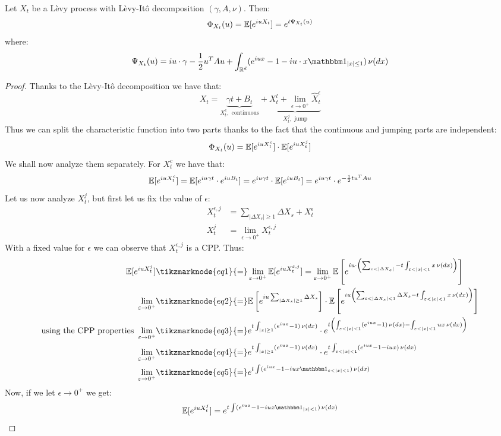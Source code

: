 \begin{definition}
    Let $X_t$ be a Lèvy process with Lèvy-Itô decomposition $(\gamma, A, \nu)$.
    Then: 
    \[ \Phi_{X_t}(u) = \mathbb{E}[e^{iuX_t}] = e^{t\Psi_{X_t}(u)} \]
    where:
    \[
        \Psi_{X_t}(u) = iu\cdot\gamma-\frac{1}{2}u^TAu+\int_{\R^d}(e^{iux} - 1 -
        iu\cdot x\I_{|x|\leq1}) \,\nu(dx)
    \]
\end{definition}
\begin{proof}
Thanks to the Lèvy-Itô decomposition we have that:
\[
    X_t = \underbrace{\gamma t + B_t}_{X_t^c, \text{ continuous}} +
    \underbrace{X_t^l + \lim_{\epsilon \to 0^+} \hat{X}^\epsilon_t}_{X_t^j, 
    \text{ jump}}
\]
Thus we can split the characteristic function into two parts thanks to the fact
that the continuous and jumping parts are independent:
\[ \Phi_{X_t}(u) = \mathbb{E}[e^{iuX_t^c}] \cdot \mathbb{E}[e^{iuX_t^j}] \]
We shall now analyze them separately. For $X_t^c$ we have that:
\[
    \mathbb{E}[e^{iuX_t^c}] = \mathbb{E}[e^{iu\gamma t} \cdot e^{iuB_t}] =
    e^{iu\gamma t} \cdot \mathbb{E}[e^{iuB_t}]  = e^{iu\gamma t} \cdot e^{-\frac{1}{2}t
    u^T A u}
\]
Let us now analyze $X_t^j$, but first let us fix the value of $\epsilon$:
\begin{align*}
    X^{\epsilon, j}_t & = \sum_{|\Delta X_s| \geq 1} \Delta X_s + X^\epsilon_t\\
    X^j_t & = \lim_{\epsilon\to0^+} X^{\epsilon, j}_t
\end{align*}
With a fixed value for $\epsilon$ we can observe that $X^{\epsilon, j}_t$ is a
CPP. Thus:
\begin{align*}
    \E[e^{iuX^j_t}] &\tikzmarknode{eq1}{=} \lim_{\epsilon\to0^+}
    \E[e^{iuX^{\epsilon, j}_t}] = \lim_{\epsilon\to0^+} \E\left[
    e^{iu\cdot\left( \sum_{\epsilon<|\Delta X_s|} - t\int_{\epsilon<|x|<1} x \,
    \nu(dx) \right)} \right] \\
    \lim_{\epsilon\to0^+} &\tikzmarknode{eq2}{=} \E\left[e^{iu\sum_{|\Delta X_s|
    \geq 1}\Delta X_s}\right] \cdot \E\left[e^{iu\left( \sum_{\epsilon<|
    \Delta X_s|<1}\Delta X_s - t\int_{\epsilon<|x|<1} x \, \nu(dx) \right)}
    \right] \\
    \text{using the CPP properties }\lim_{\epsilon\to0^+} &\tikzmarknode{eq3}{=}
    e^{t\int_{|x|\geq1}(e^{iux}-1)\,\nu(dx)} \cdot e^{t \left( \int_{\epsilon<|
    x|<1}(e^{iux}-1)\,\nu(dx) - \int_{\epsilon<|x|<1} ux \, \nu(dx) \right)} \\
    \lim_{\epsilon\to0^+} &\tikzmarknode{eq4}{=} e^{t\int_{|x|\geq1}(e^{iux}-1)
    \, \nu(dx)} \cdot e^{t\int_{\epsilon<|x|<1}(e^{iux}-1-iux)\,\nu(dx)} \\
    \lim_{\epsilon\to0^+} &\tikzmarknode{eq5}{=} e^{t\int (e^{iux}-1-iux \I_{
        \epsilon<|x|<1})\,\nu(dx)}
\end{align*} 
Now, if we let $\epsilon \to 0^+$ we get:
\[ \E[e^{iuX^j_t}] = e^{t\int(e^{iux}-1-iux\I_{|x|<1})\,\nu(dx)} \]
\end{proof}

